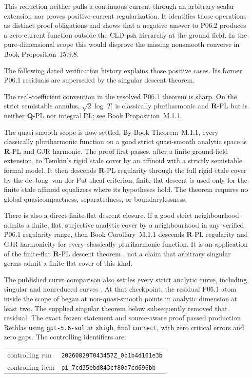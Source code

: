 \documentclass[11pt,a4paper]{article}
\theoremstyle{definition}
\theoremstyle{remark}
\begin{document}
This reduction neither pulls a continuous current through an arbitrary
scalar extension nor proves positive-current regularization.  It identifies
those operations as distinct proof obligations and shows that a negative
answer to P06.2 produces a zero-current function outside the CLD-psh
hierarchy at the ground field.  In the pure-dimensional scope this would
disprove the missing nonsmooth converse in
Book Proposition~15.9.8.

The following dated verification history explains those positive cases.
Its former P06.1 residuals are superseded by the singular descent theorem.


The real-coefficient convention in the resolved P06.1 theorem is sharp.  On the strict
semistable annulus, \(\sqrt2\log|T|\) is classically pluriharmonic and
\(\mathbf R\)-PL but is neither \(\mathbf Q\)-PL nor integral PL; see
Book Proposition~M.1.1.

The quasi-smooth scope is now settled.  By
Book Theorem~M.1.1, every classically pluriharmonic function
on a good strict quasi-smooth analytic space is \(\mathbf R\)-PL and GJR
harmonic.  The proof first passes, after a finite ground-field extension, to
Temkin's rigid \(\acute{e}\)tale cover by an affinoid with a strictly
semistable formal model.  It then descends \(\mathbf R\)-PL regularity through
the full rigid \(\acute{e}\)tale cover by the de Jong--van der Put sheaf
criterion; finite-flat descent is used only for the finite
\(\acute{e}\)tale affinoid equalizers where its hypotheses hold.  The theorem
requires no global quasicompactness, separatedness, or boundarylessness.

There is also a direct finite-flat descent closure.  If a good strict
neighbourhood admits a finite, flat, surjective analytic cover by a
neighbourhood in any verified P06.1 regularity range, then
Book Corollary~M.1.1 descends \(\mathbf R\)-PL
regularity and GJR harmonicity for every classically pluriharmonic function.
It is an application of the finite-flat \(\mathbf R\)-PL descent theorem
\cite[Proposition~5.11]{GJR26}, not a claim that arbitrary singular germs
admit a finite-flat cover of this kind.

The published curve comparison also settles every strict analytic curve,
including singular and nonreduced curves
\cite[\S4.1.2 and Proposition~3.15]{GR25Classical}.  At that checkpoint, the residual P06.1 atom inside the scope of
 began at non-quasi-smooth points in
analytic dimension at least two.  The supplied singular theorem below
subsequently removed that residual.  The exact frozen
statement and source-aware proof passed production Rethlas using
\texttt{gpt-5.6-sol} at \texttt{xhigh}, final \texttt{correct}, with zero
critical errors and zero gaps.  The controlling identifiers are:
\begin{center}
\small
\begin{tabular}{@{}ll@{}}
controlling run & \nolinkurl{20260829T043457Z_0b1b4d161e3b}\\
controlling item & \nolinkurl{pi_7cd35ebd843cf80a7cd696bb}
\end{tabular}
\end{center}
\end{document}
